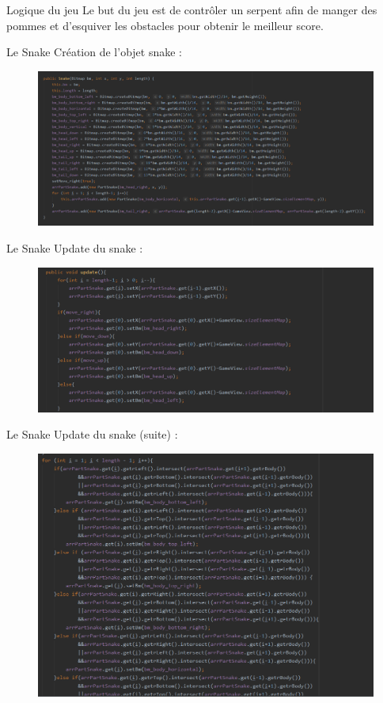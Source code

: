 \documentclass{beamer}
\begin{document}
%
%
\begin{frame}{Logique du jeu}
  Le but du jeu est de contrôler un serpent afin de manger des pommes et d'esquiver les obstacles pour obtenir le meilleur score.
\end{frame}
%
%
\begin{frame}{Le Snake}
Création de l'objet snake :
    \begin{figure}
        \includegraphics[scale=0.4]{snake.png}
    \end{figure}
\end{frame}

\begin{frame}{Le Snake}
Update du snake :
    \begin{figure}
        \centering
        \includegraphics[scale=0.5]{updateSnake1.png}
\end{figure}
\end{frame}

\begin{frame}{Le Snake}
Update du snake (suite) :
    \begin{figure}
        \includegraphics[scale=0.4]{UpdateSnake2.png}
    \end{figure}
\end{frame}
\end{document}
